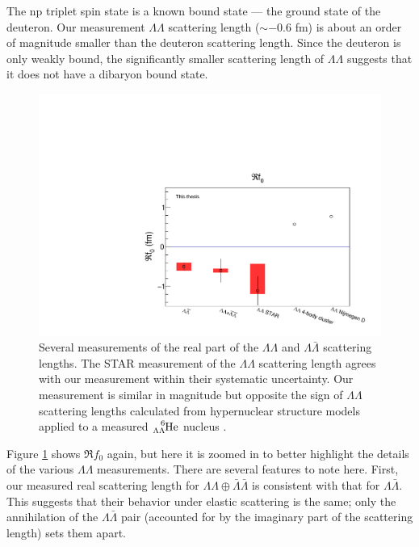 The np triplet spin state is a known bound state --- the ground state of the deuteron.
Our measurement $\Lambda\Lambda$ scattering length ($\sim-0.6$ fm) is about an order of magnitude smaller than the deuteron scattering length.
Since the deuteron is only weakly bound, the significantly smaller scattering length of $\Lambda\Lambda$ suggests that it does not have a dibaryon bound state.

\begin{figure}[hbtp]
\includegraphics[width=36pc]{Figures/FitResults/2016-10-12-Ref0Zoom.pdf}
\caption[Measurements of $\Re f_0$ for various particle pairs (zoomed)]{Several measurements of the real part of the $\Lambda\Lambda$ and $\Lambda\bar{\Lambda}$ scattering lengths. The STAR measurement \cite{Adamczyk:2014vca} of the $\Lambda\Lambda$ scattering length agrees with our measurement within their systematic uncertainty. Our measurement is similar in magnitude but opposite the sign of $\Lambda\Lambda$ scattering lengths calculated from hypernuclear structure models \cite{ Hiyama:2002yj, Filikhin:2002wm} applied to a measured $\ce{^{6}_{\Lambda\Lambda}\mathrm{He}}$ nucleus \cite{Takahashi:2001nm}.}
\label{fig:Ref0Zoom}
\end{figure}

Figure \ref{fig:Ref0Zoom} shows $\Re f_0$ again, but here it is zoomed in to better highlight the details of the various $\Lambda\Lambda$ measurements.
There are several features to note here.
First, our measured real scattering length for $\Lambda\Lambda\oplus\bar{\Lambda}\bar{\Lambda}$ is consistent with that for $\Lambda\bar{\Lambda}$.
This suggests that their behavior under elastic scattering is the same; only the annihilation of the $\Lambda\bar{\Lambda}$ pair (accounted for by the imaginary part of the scattering length) sets them apart.

